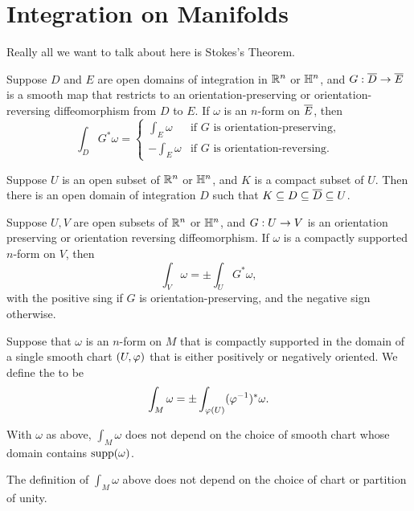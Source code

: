 \newpage\setcounter{section}{15}
\section{Integration on Manifolds}

Really all we want to talk about here is Stokes's Theorem.

\begin{prop}
Suppose $D$ and $E$ are open domains of integration in $\mathbb{R}^n$ or $\mathbb{H}^n$, and $G:\overline D \rightarrow \overline E$ is a smooth map that restricts to an orientation-preserving or orientation-reversing diffeomorphism from $D$ to $E$. If $\omega$ is an $n$-form on $\overline E$, then
\[\int_D G^*\omega = \begin{cases} \int_E \omega & \text{if $G$ is orientation-preserving},\\
-\int_E \omega & \text{if $G$ is orientation-reversing}.\end{cases}\]
\end{prop}

\begin{lem}
Suppose $U$ is an open subset of $\mathbb{R}^n$ or $\mathbb{H}^n$, and $K$ is a compact subset of $U$. Then there is an open domain of integration $D$ such that $K\subseteq D\subseteq \overline D\subseteq U$.
\end{lem}

\begin{prop}
Suppose $U, V$ are open subsets of $\mathbb{R}^n$ or $\mathbb{H}^n$, and $G:U\rightarrow V$ is an orientation preserving or orientation reversing diffeomorphism. If $\omega$ is a compactly supported $n$-form on $V$, then
\[\int_V\omega = \pm\int_U G^*\omega,\]
with the positive sing if $G$ is orientation-preserving, and the negative sign otherwise.
\end{prop}

\dfn Suppose that $\omega$ is an $n$-form on $M$ that is compactly supported in the domain of a single smooth chart $(U,\varphi)$ that is either positively or negatively oriented. We define the  to be
\[\int_M\omega = \pm\int_{\varphi(U)}(\varphi^{-1})^*\omega.\]

\begin{prop}
With $\omega$ as above, $\int_M\omega$ does not depend on the choice of smooth chart whose domain contains $\text{supp}(\omega)$.
\end{prop}

\begin{prop}
The definition of $\int_M\omega$ above does not depend on the choice of chart or partition of unity.
\end{prop}


